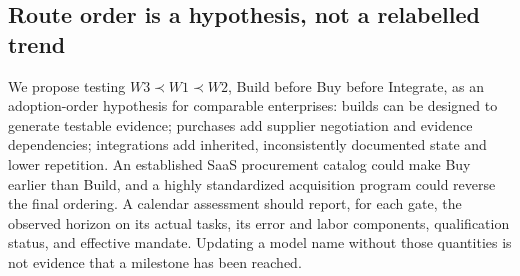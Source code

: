 \subsection{Route order is a hypothesis, not a relabelled trend}

We propose testing $W3\prec W1\prec W2$, Build before Buy before Integrate, as an adoption-order
hypothesis for comparable enterprises: builds can be designed to generate testable evidence; purchases
add supplier negotiation and evidence dependencies; integrations add inherited, inconsistently
documented state and lower repetition. An established SaaS procurement catalog could make Buy earlier than Build, and a highly
standardized acquisition program could reverse the final ordering. A calendar assessment should report,
for each gate, the observed horizon on its actual tasks, its error and labor components, qualification
status, and effective mandate. Updating a model name without those quantities is not evidence that a
milestone has been reached.

